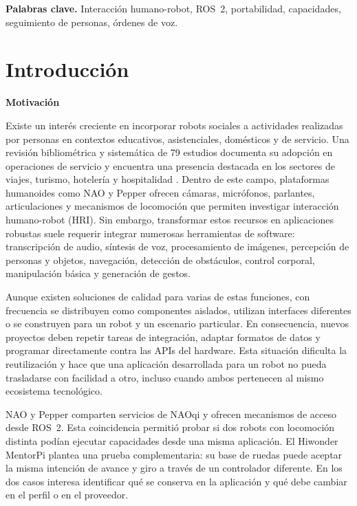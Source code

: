 \documentclass[11pt,letterpaper]{article}
\begin{document}
\noindent\textbf{Palabras clave.} Interacción humano-robot, ROS~2, portabilidad, capacidades, seguimiento de personas, órdenes de voz.

\clearpage
\section{Introducción}
\par\medskip\noindent\textbf{Motivación}\par

Existe un interés creciente en incorporar robots sociales a actividades realizadas por personas en contextos educativos, asistenciales, domésticos y de servicio. Una revisión bibliométrica y sistemática de 79 estudios documenta su adopción en operaciones de servicio y encuentra una presencia destacada en los sectores de viajes, turismo, hotelería y hospitalidad \cite{socialrobots}. Dentro de este campo, plataformas humanoides como NAO y Pepper ofrecen cámaras, micrófonos, parlantes, articulaciones y mecanismos de locomoción que permiten investigar interacción humano-robot (HRI). Sin embargo, transformar estos recursos en aplicaciones robustas suele requerir integrar numerosas herramientas de software: transcripción de audio, síntesis de voz, procesamiento de imágenes, percepción de personas y objetos, navegación, detección de obstáculos, control corporal, manipulación básica y generación de gestos.

Aunque existen soluciones de calidad para varias de estas funciones, con frecuencia se distribuyen como componentes aislados, utilizan interfaces diferentes o se construyen para un robot y un escenario particular. En consecuencia, nuevos proyectos deben repetir tareas de integración, adaptar formatos de datos y programar directamente contra las APIs del hardware. Esta situación dificulta la reutilización y hace que una aplicación desarrollada para un robot no pueda trasladarse con facilidad a otro, incluso cuando ambos pertenecen al mismo ecosistema tecnológico.

NAO y Pepper comparten servicios de NAOqi y ofrecen mecanismos de acceso desde ROS~2. Esta coincidencia permitió probar si dos robots con locomoción distinta podían ejecutar capacidades desde una misma aplicación. El Hiwonder MentorPi plantea una prueba complementaria: su base de ruedas puede aceptar la misma intención de avance y giro a través de un controlador diferente. En los dos casos interesa identificar qué se conserva en la aplicación y qué debe cambiar en el perfil o en el proveedor.
\end{document}
